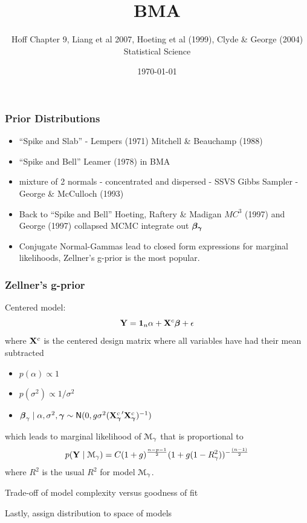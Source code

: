 \documentclass[]{beamer}
\title{BMA}
\author{Hoff Chapter 9, Liang et al 2007, Hoeting et al (1999), Clyde \&
 George (2004) Statistical Science}
\date{\today}
\begin{document}
\maketitle


\begin{frame}\frametitle{Prior Distributions}
  \begin{itemize}
  \item ``Spike and Slab'' - Lempers (1971) Mitchell \& Beauchamp (1988) \pause 
  \item ``Spike and Bell''  Leamer (1978)  in BMA \pause
  \item   mixture of 2 normals - concentrated and dispersed - SSVS Gibbs Sampler -  George \& McCulloch (1993) \pause
\item Back to ``Spike and Bell''  Hoeting, Raftery \& Madigan $MC^3$ (1997) and George  (1997) collapsed MCMC integrate out $\boldsymbol{\beta_\gamma}$
  \item Conjugate Normal-Gammas lead to closed form expressions for
  marginal likelihoods, Zellner's g-prior is the most popular. \pause 
  \end{itemize}
\end{frame}

\begin{frame}\frametitle{Zellner's g-prior}
  Centered model:  $$\mathbf{Y} = \mathbf{1}_n \alpha + \mathbf{X}^c \boldsymbol{\beta} + \epsilon$$  
  where $\mathbf{X}^c$ is the centered design matrix where all variables have
  had their mean subtracted \pause 
\begin{itemize}
\item   $p(\alpha) \propto 1$ \pause 
\item  $p(\sigma^2) \propto 1/\sigma^2$  \pause 
\item  $\boldsymbol{\beta}_\gamma \mid \alpha, \sigma^2, \boldsymbol{\gamma} \sim \textsf{N}(0, g \sigma^2
  ({\mathbf{X}_{\boldsymbol{\gamma}}^c}^\prime \mathbf{X}_{\boldsymbol{\gamma}}^c)^{-1})$ \pause 
\end{itemize}
which leads to marginal likelihood of ${\cal M}_\gamma$ that is proportional
to $$ p(\mathbf{Y} \mid {\cal M}_\gamma) = C (1 + g)^{\frac{n-p-1}{2}} ( 1 + g (1 -
 R^2_\gamma))^{- \frac{(n-1)}{2}}$$
where $R^2$ is the usual $R^2$ for model ${\cal M}_\gamma$.
\pause 

Trade-off of model complexity versus goodness of fit

\bigskip
Lastly, assign distribution to space of models
\end{frame}
\end{document}
